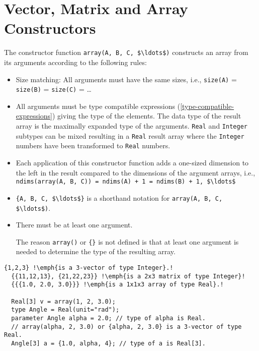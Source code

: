 \section{Vector, Matrix and Array Constructors}

The constructor function \lstinline[mathescape=true]!array(A, B, C, $\ldots$)! constructs an array from its arguments according to the following rules:
\begin{itemize}
\item
  Size matching: All arguments must have the same sizes, i.e.,
  \lstinline!size(A)! = \lstinline!size(B)! = \lstinline!size(C)! = \ldots
\item
  All arguments must be type compatible expressions (\autoref{type-compatible-expressions}) giving the type of the elements.  The data type of the result array is the
  maximally expanded type of the arguments. \lstinline!Real! and \lstinline!Integer! subtypes can be mixed resulting in a \lstinline!Real! result array where the
  \lstinline!Integer! numbers have been transformed to \lstinline!Real! numbers.
\item
  Each application of this constructor function adds a one-sized dimension to the left in the result compared to the dimensions of the argument arrays, i.e.,
  \lstinline[mathescape=true]!ndims(array(A, B, C)) = ndims(A) + 1 = ndims(B) + 1, $\ldots$!
\item
  \lstinline[mathescape=true]!{A, B, C, $\ldots$}! is a shorthand notation for \lstinline[mathescape=true]!array(A, B, C, $\ldots$)!.
\item
  There must be at least one argument.
  \begin{nonnormative}
  The reason \lstinline!array()! or \lstinline!{}! is not defined is that at least one argument is needed to determine the type of the resulting array.
  \end{nonnormative}
\end{itemize}

\begin{example}
\begin{lstlisting}[language=modelica, escapechar=!]
  {1,2,3} !\emph{is a 3-vector of type Integer}.!
  {{11,12,13}, {21,22,23}} !\emph{is a 2x3 matrix of type Integer}!
  {{{1.0, 2.0, 3.0}}} !\emph{is a 1x1x3 array of type Real}.!

  Real[3] v = array(1, 2, 3.0);
  type Angle = Real(unit="rad");
  parameter Angle alpha = 2.0; // type of alpha is Real.
  // array(alpha, 2, 3.0) or {alpha, 2, 3.0} is a 3-vector of type Real.
  Angle[3] a = {1.0, alpha, 4}; // type of a is Real[3].
\end{lstlisting}
\end{example}


